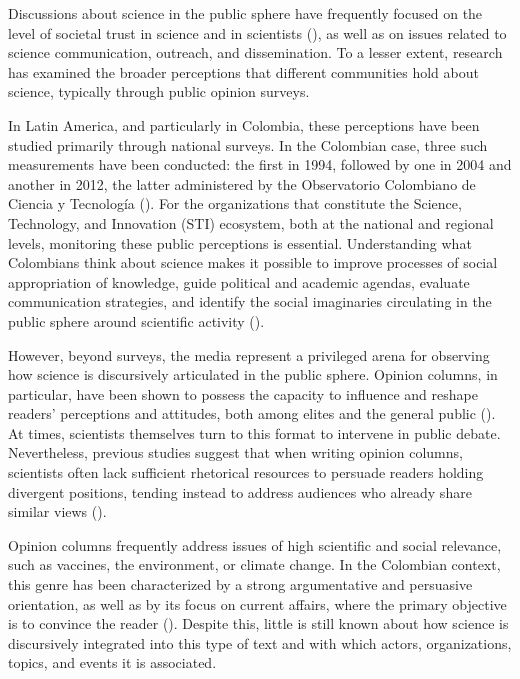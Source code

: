 \documentclass[11pt,a4paper]{article}
\begin{document}
	Discussions about science in the public sphere have frequently focused on the level of societal trust in science and in scientists (\cite{Cologna2025, Sturgis2021, Mede2022}), as well as on issues related to science communication, outreach, and dissemination. To a lesser extent, research has examined the broader perceptions that different communities hold about science, typically through public opinion surveys.
	
	In Latin America, and particularly in Colombia, these perceptions have been studied primarily through national surveys. In the Colombian case, three such measurements have been conducted: the first in 1994, followed by one in 2004 and another in 2012, the latter administered by the Observatorio Colombiano de Ciencia y Tecnología (\cite{Daza_Caicedo2014}). For the organizations that constitute the Science, Technology, and Innovation (STI) ecosystem, both at the national and regional levels, monitoring these public perceptions is essential. Understanding what Colombians think about science makes it possible to improve processes of social appropriation of knowledge, guide political and academic agendas, evaluate communication strategies, and identify the social imaginaries circulating in the public sphere around scientific activity (\cite{Daza_Caicedo2014}).
	
	However, beyond surveys, the media represent a privileged arena for observing how science is discursively articulated in the public sphere. Opinion columns, in particular, have been shown to possess the capacity to influence and reshape readers’ perceptions and attitudes, both among elites and the general public (\cite{Coppock2018}). At times, scientists themselves turn to this format to intervene in public debate. Nevertheless, previous studies suggest that when writing opinion columns, scientists often lack sufficient rhetorical resources to persuade readers holding divergent positions, tending instead to address audiences who already share similar views (\cite{Syfert2025}).
	
	Opinion columns frequently address issues of high scientific and social relevance, such as vaccines, the environment, or climate change. In the Colombian context, this genre has been characterized by a strong argumentative and persuasive orientation, as well as by its focus on current affairs, where the primary objective is to convince the reader (\cite{CaroLopera2020}). Despite this, little is still known about how science is discursively integrated into this type of text and with which actors, organizations, topics, and events it is associated.
	
\end{document}

